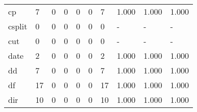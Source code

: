 \begin{longtable}{lp{1.3cm}p{1.3cm}p{1.3cm}p{1.3cm}p{1.3cm}p{1.3cm}p{1.3cm}p{1.3cm}p{1.3cm}}
cp        &                      7 &                                  0 &                                 0 &                                0 &                                 0 &                               7 &                                1.000 &                                  1.000 &                                1.000 \\
csplit    &                      0 &                                  0 &                                 0 &                                0 &                                 0 &                               0 &                                    - &                                      - &                                    - \\
cut       &                      0 &                                  0 &                                 0 &                                0 &                                 0 &                               0 &                                    - &                                      - &                                    - \\
date      &                      2 &                                  0 &                                 0 &                                0 &                                 0 &                               2 &                                1.000 &                                  1.000 &                                1.000 \\
dd        &                      7 &                                  0 &                                 0 &                                0 &                                 0 &                               7 &                                1.000 &                                  1.000 &                                1.000 \\
df        &                     17 &                                  0 &                                 0 &                                0 &                                 0 &                              17 &                                1.000 &                                  1.000 &                                1.000 \\
dir       &                     10 &                                  0 &                                 0 &                                0 &                                 0 &                              10 &                                1.000 &                                  1.000 &                                1.000 \\

\end{longtable}
